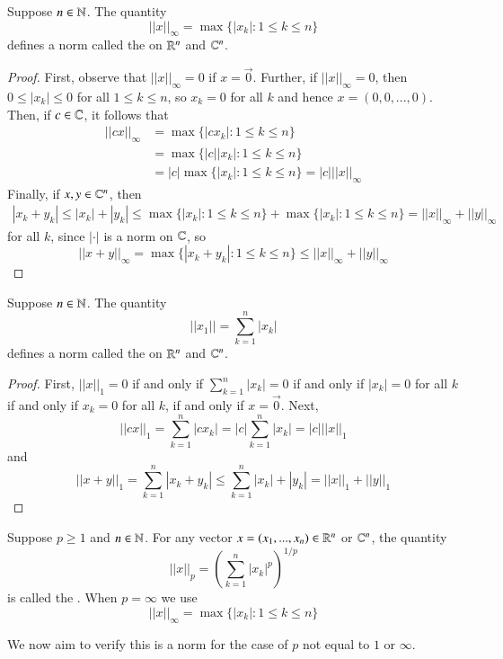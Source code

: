 \begin{prop}
    Suppose $n \in \mathbb N$. The quantity $$||x||_{\infty} = \max\{|x_k|:1\leq k \leq n\}$$ defines a norm called the  on $\mathbb R^n$ and $\mathbb C^n$.
\end{prop}
\begin{proof}
    First, observe that $||x||_{\infty} = 0$ if $x = \vec{0}$. Further, if $||x||_{\infty} = 0$, then $0 \leq |x_k| \leq 0$ for all $1 \leq k \leq n$, so $x_k = 0$ for all $k$ and hence $x = (0,0,...,0)$. Then, if $c \in \mathbb C$, it follows that \begin{align*}
        ||cx||_{\infty} &= \max\{|cx_k|:1\leq k \leq n\} \\
        &= \max\{|c||x_k|:1\leq k\leq n\} \\
        &= |c|\max\{|x_k|:1\leq k \leq n\} = |c|||x||_{\infty}
    \end{align*}
    Finally, if $x,y \in \mathbb C^n$, then \begin{align*}
        |x_k+y_k| \leq |x_k| + |y_k| \leq \max\{|x_k|:1\leq k\leq n\} + \max\{|x_k|:1\leq k\leq n\} = ||x||_{\infty} + ||y||_{\infty}
    \end{align*}
    for all $k$, since $|\cdot|$ is a norm on $\mathbb C$, so $$||x+y||_{\infty} = \max\{|x_k+y_k|:1\leq k \leq n\} \leq ||x||_{\infty} + ||y||_{\infty}$$
\end{proof}

\begin{prop}
    Suppose $n \in \mathbb N$. The quantity $$||x_1|| = \sum_{k=1}^n|x_k|$$ defines a norm called the  on $\mathbb R^n$ and $\mathbb C^n$.
\end{prop}
\begin{proof}
    First, $||x||_1 = 0$ if and only if $\sum_{k=1}^n|x_k| = 0$ if and only if $|x_k| = 0$ for all $k$ if and only if $x_k = 0$ for all $k$, if and only if $x = \vec{0}$. Next, $$||cx||_1 = \sum_{k=1}^n|cx_k| = |c|\sum_{k=1}^n|x_k| = |c|||x||_1$$ and $$||x + y||_1 = \sum_{k=1}^n|x_k+y_k| \leq \sum_{k=1}^n|x_k|+|y_k| = ||x||_1 + ||y||_1$$
\end{proof}

\begin{defn}
    Suppose $p \geq 1$ and $n \in \mathbb N$. For any vector $x = (x_1,...,x_n) \in \mathbb R^n$ or $\mathbb C^n$, the quantity $$||x||_p = \left(\sum_{k=1}^n|x_k|^p\right)^{1/p}$$ is called the . When $p = \infty$ we use $$||x||_{\infty} = \max\{|x_k|:1\leq k\leq n\}$$
\end{defn}

We now aim to verify this is a norm for the case of $p$ not equal to $1$ or $\infty$.

